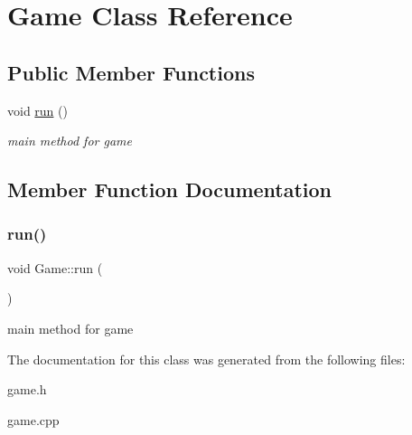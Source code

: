 \hypertarget{class_game}{}\section{Game Class Reference}
\label{class_game}
\subsection*{Public Member Functions}
\begin{DoxyCompactItemize}
\item 
void \hyperlink{class_game_a1ab78f5ed0d5ea879157357cf2fb2afa}{run} ()
\begin{DoxyCompactList}\small\item\em main method for game \end{DoxyCompactList}\end{DoxyCompactItemize}


\subsection{Member Function Documentation}
\mbox{\label{class_game_a1ab78f5ed0d5ea879157357cf2fb2afa}} 
\subsubsection{\texorpdfstring{run()}{run()}}
{\footnotesize\ttfamily void Game\+::run (\begin{DoxyParamCaption}{ }\end{DoxyParamCaption})}



main method for game 



The documentation for this class was generated from the following files\+:\begin{DoxyCompactItemize}
\item 
game.\+h\item 
game.\+cpp\end{DoxyCompactItemize}
